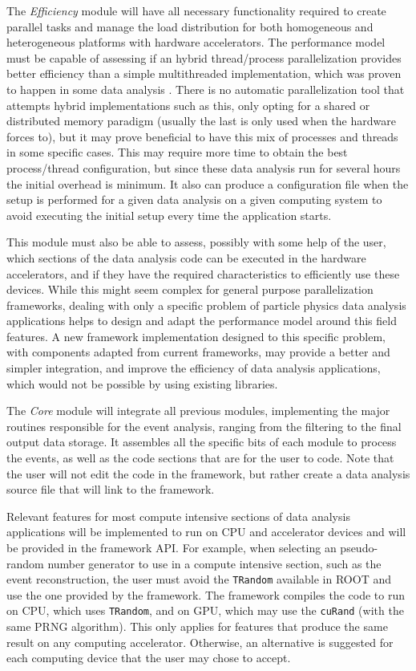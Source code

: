 The \textit{Efficiency} module will have all necessary functionality required to create parallel tasks and manage the load distribution for both homogeneous and heterogeneous platforms with hardware accelerators. The performance model must be capable of assessing if an hybrid thread/process parallelization provides better efficiency than a simple multithreaded implementation, which was proven to happen in some data analysis \cite{paperAMP}. There is no automatic parallelization tool that attempts hybrid implementations such as this, only opting for a shared or distributed memory paradigm (usually the last is only used when the hardware forces to), but it may prove beneficial to have this mix of processes and threads in some specific cases. This may require more time to obtain the best process/thread configuration, but since these data analysis run for several hours the initial overhead is minimum. It also can produce a configuration file when the setup is performed for a given data analysis on a given computing system to avoid executing the initial setup every time the application starts.

This module must also be able to assess, possibly with some help of the user, which sections of the data analysis code can be executed in the hardware accelerators, and if they have the required characteristics to efficiently use these devices. While this might seem complex for general purpose parallelization frameworks, dealing with only a specific problem of particle physics data analysis applications helps to design and adapt the performance model around this field features. A new framework implementation designed to this specific problem, with components adapted from current frameworks, may provide a better and simpler integration, and improve the efficiency of data analysis applications, which would not be possible by using existing libraries.

The \textit{Core} module will integrate all previous modules, implementing the major routines responsible for the event analysis, ranging from the filtering to the final output data storage. It assembles all the specific bits of each module to process the events, as well as the code sections that are for the user to code. Note that the user will not edit the code in the framework, but rather create a data analysis source file that will link to the framework.

Relevant features for most compute intensive sections of data analysis applications will be implemented to run on CPU and accelerator devices and will be provided in the framework API. For example, when selecting an pseudo-random number generator to use in a compute intensive section, such as the event reconstruction, the user must avoid the \texttt{TRandom} available in ROOT and use the one provided by the framework. The framework compiles the code to run on CPU, which uses \texttt{TRandom}, and on GPU, which may use the \texttt{cuRand} (with the same PRNG algorithm). This only applies for features that produce the same result on any computing accelerator. Otherwise, an alternative is suggested for each computing device that the user may chose to accept.

